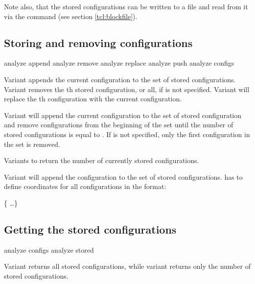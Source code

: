 Note also, that the stored configurations can be written to a file and
read from it via the  command (see section
\vref{tcl:blockfile}).

\subsection{Storing and removing configurations}
\label{analyze:append}
\label{analyze:push}
\label{analyze:replace}
\label{analyze:remove}

\begin{essyntax}
   analyze append
   analyze remove 
   analyze replace  
   analyze push 
   analyze configs 
\end{essyntax}

Variant  appends the current configuration to the set of
stored configurations.  Variant  removes the th
stored configuration, or all, if  is not specified.  Variant
 will replace the th configuration with the
current configuration.

Variant  will append the current configuration to the set
of stored configuration and remove configurations from the beginning
of the set until the number of stored configurations is equal to
. If  is not specified, only the first
configuration in the set is removed.

Variants  to  return the number of currently
stored configurations.

Variant  will append the configuration  to the
set of stored configurations.  has to define coordinates
for all configurations in the format:
\begin{code}
 \{      \dots \}
\end{code}

\subsection{Getting the stored configurations}
\label{analyze:configs}
\label{analyze:stored}
\begin{essyntax}
   analyze configs
   analyze stored 
\end{essyntax}

Variant  returns all stored configurations, while variant
 returns only the number of stored configurations.

